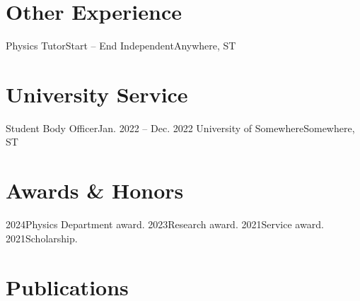 \documentclass[letterpaper,11pt]{article}
\begin{document}

\section{Other Experience}
    \cvSubHeadingListStart
        \cvSubheading
            {Physics Tutor}{Start -- End}
            {Independent}{Anywhere, ST}
            \cvItemListStart
            \cvItemListEnd
            
    \cvSubHeadingListEnd



\section{University Service}
    \cvSubHeadingListStart
        \cvSubheading
            {Student Body Officer}{Jan. 2022 -- Dec. 2022}
            {University of Somewhere}{Somewhere, ST}
            \cvItemListStart
            \cvItemListEnd

    \cvSubHeadingListEnd



\section{Awards \& Honors}
    \cvSubHeadingListStart
        \cvAwardsItem
            {2024}{Physics Department award.}
        \cvAwardsItem
            {2023}{Research award.}
        \cvAwardsItem
            {2021}{Service award.}
        \cvAwardsItem
            {2021}{Scholarship.}
        
    \cvSubHeadingListEnd



\section{Publications}
    \cvSubHeadingListStart
        \item
        \printbibliography[heading=none]
    \cvSubHeadingListEnd
\end{document}
